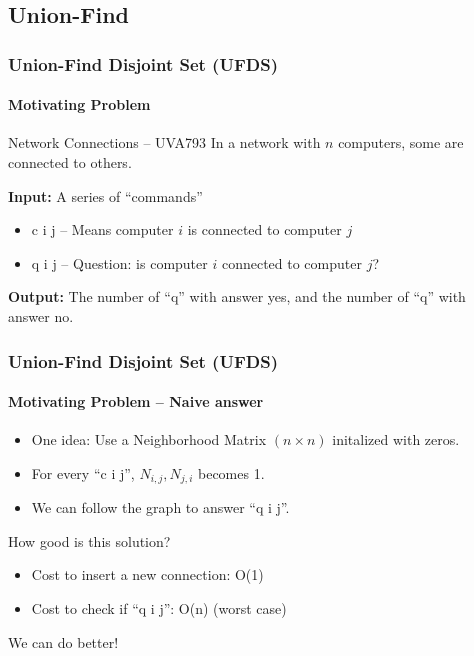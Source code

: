 \documentclass{beamer}
\begin{document}
\subsection{Union-Find}
\begin{frame}
  \frametitle{Union-Find Disjoint Set (UFDS)}
  \framesubtitle{Motivating Problem}

  \begin{block}{Network Connections -- UVA793}
    In a network with $n$ computers, some are connected to others.\\
    \bigskip

    {\bf Input:} A series of ``commands''
    \begin{itemize}
    \item c i j -- Means computer $i$ is connected to computer $j$
    \item q i j -- Question: is computer $i$ connected to computer $j$?
    \end{itemize}

    \bigskip

    {\bf Output:} The number of ``q'' with answer yes, and the number
    of ``q'' with answer no.

  \end{block}
\end{frame}

\begin{frame}
  \frametitle{Union-Find Disjoint Set (UFDS)}
  \framesubtitle{Motivating Problem -- Naive answer}

  \begin{itemize}
  \item One idea: Use a Neighborhood Matrix $(n\times n)$ initalized with zeros.
  \item For every ``c i j'', $N_{i,j}, N_{j,i}$ becomes 1.
  \item We can follow the graph to answer ``q i j''.
  \end{itemize}

  \bigskip

  How good is this solution?
  \begin{itemize}
  \item Cost to insert a new connection: O(1)
  \item Cost to check if ``q i j'': O(n) (worst case)
  \end{itemize}

  \bigskip We can do better!
\end{frame}
\end{document}
